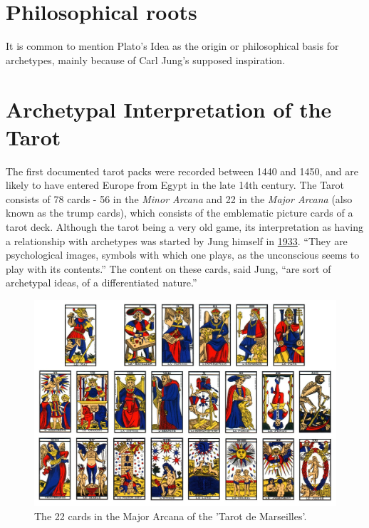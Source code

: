 \documentclass[]{book}
\begin{document}
\hypertarget{philosophical-roots}{%
\section{Philosophical roots}\label{philosophical-roots}}

It is common to mention Plato's Idea as the origin or philosophical basis for archetypes, mainly because of Carl Jung's supposed inspiration.

\hypertarget{archetypal-interpretation-of-the-tarot}{%
\section{Archetypal Interpretation of the Tarot}\label{archetypal-interpretation-of-the-tarot}}

The first documented tarot packs were recorded between 1440 and 1450, and are likely to have entered Europe from Egypt in the late 14th century. The Tarot consists of 78 cards - 56 in the \emph{Minor Arcana} and 22 in the \emph{Major Arcana} (also known as the trump cards), which consists of the emblematic picture cards of a tarot deck. Although the tarot being a very old game, its interpretation as having a relationship with archetypes was started by Jung himself in \href{https://marykgreer.com/2008/03/31/carl-jung-and-tarot/}{1933}. ``They are psychological images, symbols with which one plays, as the unconscious seems to play with its contents.'' The content on these cards, said Jung, ``are sort of archetypal ideas, of a differentiated nature.''

\begin{figure}

{\centering \includegraphics[width=\textwidth]{img/tarot} 

}

\caption{The 22 cards in the Major Arcana of the 'Tarot de Marseilles'.}\label{fig:unnamed-chunk-5}
\end{figure}
\end{document}
